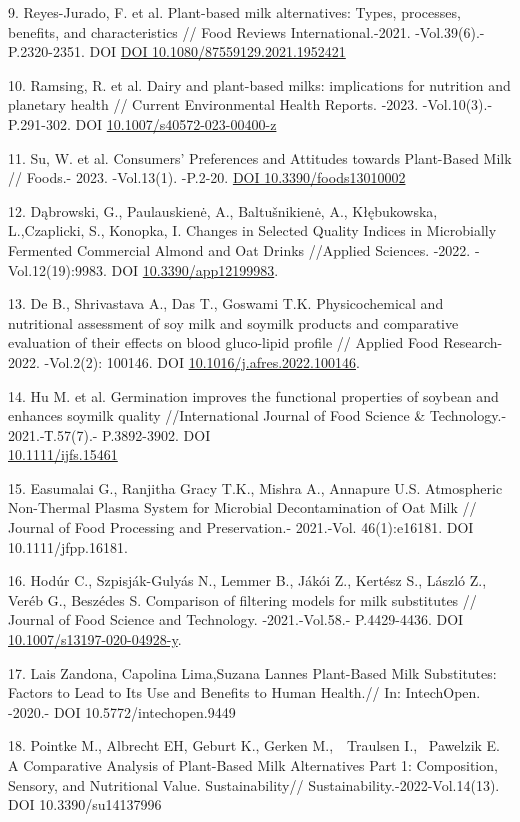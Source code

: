 \begin{references}
9. Reyes-Jurado, F. et al. Plant-based milk alternatives: Types,
processes, benefits, and characteristics // Food Reviews
International.-2021. -Vol.39(6).- P.2320-2351.
DOI \href{http://dx.doi.org/10.1080/87559129.2021.1952421}{DOI 10.1080/87559129.2021.1952421}

10. Ramsing, R. et al. Dairy and plant-based milks: implications for
nutrition and planetary health // Current Environmental Health Reports.
-2023. -Vol.10(3).-P.291-302.
DOI \href{https://doi.org/10.1007/s40572-023-00400-z}{10.1007/s40572-023-00400-z}

11. Su, W. et al. Consumers' Preferences and Attitudes towards
Plant-Based Milk // Foods.- 2023. -Vol.13(1). -P.2-20.
\href{https://doi.org/10.3390/foods13010002}{DOI 10.3390/foods13010002}

12. Dąbrowski, G., Paulauskienė, A., Baltušnikienė, A., Kłębukowska,
L.,Czaplicki, S., Konopka, I. Chan\-ges in Selected Quality Indices in
Microbially Fermented Commercial Almond and Oat Drinks //Applied
Sciences. -2022. -Vol.12(19):9983. DOI
\href{https://doi.org/10.3390/app12199983}{10.3390/app12199983}.

13. De B., Shrivastava A., Das T., Goswami T.K. Physicochemical and
nutritional assessment of soy milk and soymilk products and comparative
evaluation of their effects on blood gluco-lipid profile // Applied Food
Research-2022. -Vol.2(2): 100146. DOI
\href{https://doi.org/10.1016/j.crfs.2022.100146}{10.1016/j.afres.2022.100146}.

14. Hu M. et al. Germination improves the functional properties of
soybean and enhances soymilk quality //International Journal of Food
Science \& Technology.- 2021.-Т.57(7).- P.3892-3902.
DOI \\\href{http://dx.doi.org/10.1111/ijfs.15461}{10.1111/ijfs.15461}

15. Easumalai G., Ranjitha Gracy T.K., Mishra A., Annapure U.S.
Atmospheric Non-Thermal Plasma System for Microbial Decontamination of
Oat Milk // Journal of Food Processing and Preservation.- 2021.-Vol.
46(1):e16181. DOI 10.1111/jfpp.16181.

16. Hodúr C., Szpisják-Gulyás N., Lemmer B., Jákói Z., Kertész S., László
Z., Veréb G., Beszédes S. Comparison of filtering models for milk
substitutes // Journal of Food Science and Technology. -2021.-Vol.58.-
P.4429-4436. DOI
\href{https://doi.org/10.1007/s13197-020-04928-y}{10.1007/s13197-020-04928-y}.

17. Lais Zandona, Capolina Lima,Suzana Lannes Plant-Based Milk
Substitutes: Factors to Lead to Its Use and Benefits to Human Health.//
In: IntechOpen. -2020.- DOI 10.5772/intechopen.9449

18. Pointke M., Albrecht EH, Geburt K., Gerken M.,~~Traulsen I.,~
Pawelzik E. A Comparative Analysis of Plant-Based Milk Alternatives Part
1: Composition, Sensory, and Nutritional Value. Sustainability//
Sustainability.-2022-Vol.14(13). DOI 10.3390/su14137996~
\end{references}

